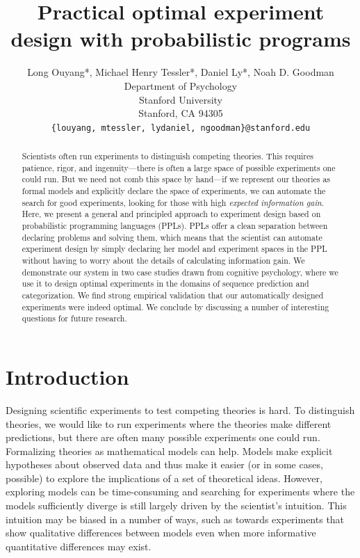 \documentclass{article}
\title{Practical optimal experiment design with probabilistic programs}
\author{
  Long Ouyang*, Michael Henry Tessler*, Daniel Ly*, Noah D. Goodman\\
  Department of Psychology\\
  Stanford University\\
  Stanford, CA 94305 \\
  \texttt{\{louyang, mtessler, lydaniel, ngoodman\}@stanford.edu}\\
}
\newcommand{\ndg}[1]{\textcolor{Green}{[ndg: #1]}}
\newcommand{\mht}[1]{\textcolor{Blue}{[mht: #1]}}
\newcommand{\lou}[1]{\textcolor{orange}{[lou: #1]}}
\begin{document}

\maketitle

\begin{abstract}

Scientists often run experiments to distinguish competing theories.
This requires patience, rigor, and ingenuity---there is often a large space of possible experiments one could run.
But we need not comb this space by hand---if we represent our theories as formal models and explicitly declare the space of experiments, we can automate the search for good experiments, looking for those with high \emph{expected information gain}.
Here, we present a general and principled approach to experiment design based on probabilistic programming languages (PPLs).
PPLs offer a clean separation between declaring problems and solving them, which means that the scientist can automate experiment design by simply declaring her model and experiment spaces in the PPL without having to worry about the details of calculating information gain.
We demonstrate our system in two case studies drawn from cognitive psychology, where we use it to design optimal experiments in the domains of sequence prediction and categorization.
We find strong empirical validation that our automatically designed experiments were indeed optimal.
We conclude by discussing a number of interesting questions for future research.


\end{abstract}


\section{Introduction}
Designing scientific experiments to test competing theories is hard.
To distinguish theories, we would like to run experiments where the theories make different predictions, but there are often many possible experiments one could run.
Formalizing theories as mathematical models can help.
Models make explicit hypotheses about observed data and thus make it easier (or in some cases, possible) to explore the implications of a set of theoretical ideas.
However, exploring models can be time-consuming and searching for experiments where the models sufficiently diverge is still largely driven by the scientist's intuition.
This intuition may be biased in a number of ways, such as towards experiments that show qualitative differences between models even when more informative quantitative differences may exist.
\end{document}
